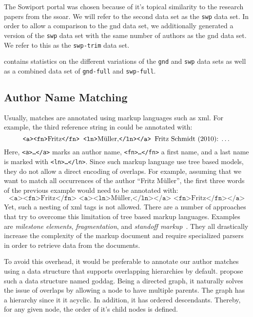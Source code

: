 The Sowiport portal was chosen because of it's topical similarity to the research papers from the \gls{ssoar}.
We will refer to the second data set as the \texttt{swp} data set.
In order to allow a comparison to the \gls{gnd} data set, we additionally generated a version of the \texttt{swp} data set with the same number of authors as the \gls{gnd} data set.
We refer to this as the \texttt{swp-trim} data set.

 contains statistics on the different variations of the \texttt{gnd} and \texttt{swp} data sets as well as a combined data set of \texttt{gnd-full} and \texttt{swp-full}.

\subsection{Author Name Matching}\label{subsec:i-author-name-matching}
Usually, matches are annotated using markup languages such as \gls{xml}.
For example, the third reference string in  could be annotated with:
\begin{equation*}
  \texttt{<a><fn>}\text{Fritz}\texttt{</fn> <ln>}\text{M\"{u}ller,}\texttt{</ln></a> }\text{Fritz Schmidt (2010): \dots}
\end{equation*}
Here, \texttt{<a>\dots</a>} marks an author name, \texttt{<fn>\dots</fn>} a first name, and a last name is marked with \texttt{<ln>\dots</ln>}.
Since such markup language use tree based models, they do not allow a direct encoding of overlaps.
For example, assuming that we want to match all occurrences of the author ``Fritz M\"{u}ller'', the first three words of the previous example would need to be annotated with:
\begin{equation*}
  \texttt{<a><fn>}\text{Fritz}\texttt{</fn> <a><ln>}\text{M\"{u}ller,}\texttt{</ln></a> <fn>}\text{Fritz}\texttt{</fn></a>}
\end{equation*}
Yet, such a nesting of \gls{xml} tags is not allowed.
There are a number of approaches that try to overcome this limitation of tree based markup languages.
Examples are \textit{milestone elements}, \textit{fragmentation}, and \textit{standoff markup}~\citep{sperberg2000goddag}. They all drastically increase the complexity of the markup document and require specialized parsers in order to retrieve data from the documents.

To avoid this overhead, it would be preferable to annotate our author matches using a data structure that supports overlapping hierarchies by default.
\citet{sperberg2000goddag} propose such a data structure named \acrfull{goddag}.
Being a directed graph, it naturally solves the issue of overlaps by allowing a node to have multiple parents.
The graph has a hierarchy since it it acyclic.
In addition, it has ordered descendants.
Thereby, for any given node, the order of it's child nodes is defined.

